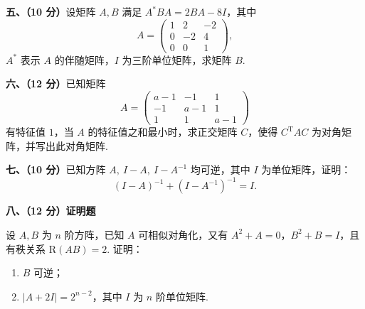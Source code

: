 \documentclass[a4paper,11pt]{ctexart}
\newcommand{\R}{\mathrm{R}}
\newcommand{\T}{\mathrm{T}}
\begin{document}
\vspace{0.7em}

\textbf{五、（10 分）}设矩阵 $A, B$ 满足 $A^* B A = 2BA - 8I$，其中
\[
  A = \begin{pmatrix}
    1 & 2 & -2 \\
    0 & -2 & 4 \\
    0 & 0 & 1
  \end{pmatrix},
\]
$A^*$ 表示 $A$ 的伴随矩阵，$I$ 为三阶单位矩阵，求矩阵 $B$.

\vspace{0.7em}

\textbf{六、（12 分）}已知矩阵
\[
  A = \begin{pmatrix}
    a - 1 & -1 & 1 \\
    -1 & a - 1 & 1 \\
    1 & 1 & a - 1
  \end{pmatrix}
\]
有特征值 $1$，当 $A$ 的特征值之和最小时，求正交矩阵 $C$，使得 $C^{\T} A C$ 为对角矩阵，并写出此对角矩阵.

\vspace{0.7em}

\textbf{七、（10 分）}已知方阵 $A,\ I - A,\ I - A^{-1}$ 均可逆，其中 $I$ 为单位矩阵，证明：
\[
  (I - A)^{-1} + (I - A^{-1})^{-1} = I.
\]

\vspace{0.7em}

\textbf{八、（12 分）证明题}

设 $A, B$ 为 $n$ 阶方阵，已知 $A$ 可相似对角化，又有 $A^2 + A = 0$，$B^2 + B = I$，且有秩关系 $\R(AB) = 2$.
证明：
\begin{enumerate}[label=(\arabic*), leftmargin=2.4em, itemsep=0.25em, topsep=0.3em]
  \item $B$ 可逆；
  \item $|A + 2I| = 2^{n-2}$，其中 $I$ 为 $n$ 阶单位矩阵.
\end{enumerate}
\end{document}
